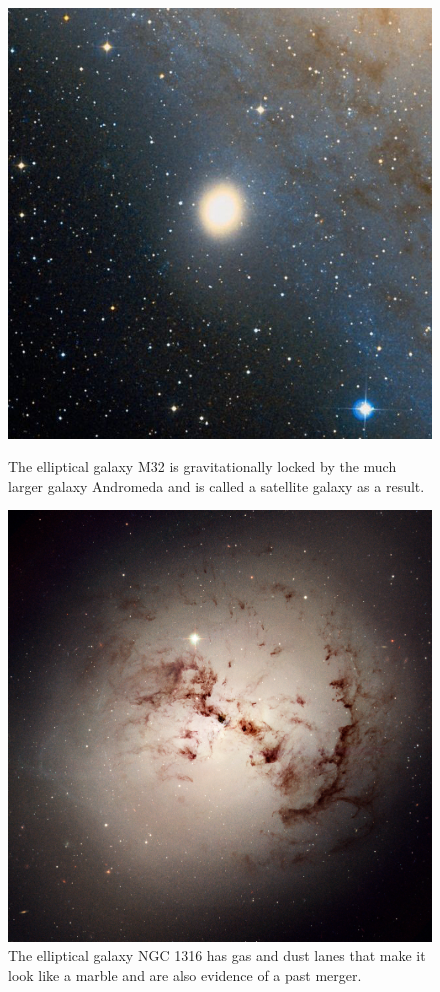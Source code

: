 \documentclass[12pt, oneside]{smuthesis}
\begin{document}
\begin{figure}[H]
	\centering
	\begin{minipage}{0.48\textwidth}
		\centering
		\includegraphics[width=0.9\linewidth]{M32}
		\caption{The elliptical galaxy M32 is gravitationally locked by the much larger galaxy Andromeda and is called a satellite galaxy as a result.}
		\label{fig:M32}
	\end{minipage}
	\begin{minipage}{0.04\textwidth}
		\centering
	\end{minipage}
	\begin{minipage}{0.48\textwidth}
		\centering
		\includegraphics[width=0.9\linewidth]{NGC1316}
		\caption{The elliptical galaxy NGC 1316 has gas and dust lanes that make it look like a marble and are also evidence of a past merger.}
		\label{fig:NGC1316}
	\end{minipage}
\end{figure}
\end{document}
